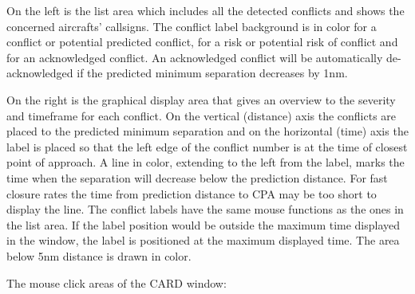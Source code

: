 \documentclass[a4paper,oneside,11pt]{memoir}
\begin{document}
\bigskip

On the left is the list area which includes all the detected conflicts and shows the concerned aircrafts’ callsigns. The conflict label background is in  color for a conflict or potential predicted conflict,  for a risk or potential risk of conflict and  for an acknowledged conflict. An acknowledged conflict will be automatically de-acknowledged if the predicted minimum separation decreases by 1nm.

\bigskip

On the right is the graphical display area that gives an overview to the severity and timeframe for each conflict. On the vertical (distance) axis the conflicts are placed to the predicted minimum separation and on the horizontal (time) axis the label is placed so that the left edge of the conflict number is at the time of closest point of approach. A line in  color, extending to the left from the label, marks the time when the separation will decrease below the prediction distance. For fast closure rates the time from prediction distance to CPA may be too short to display the line. The conflict labels have the same mouse functions as the ones in the list area. If the label position would be outside the maximum time displayed in the window, the label is positioned at the maximum displayed time. The area below 5nm distance is drawn in  color.

\bigskip

The mouse click areas of the CARD window:
\end{document}
